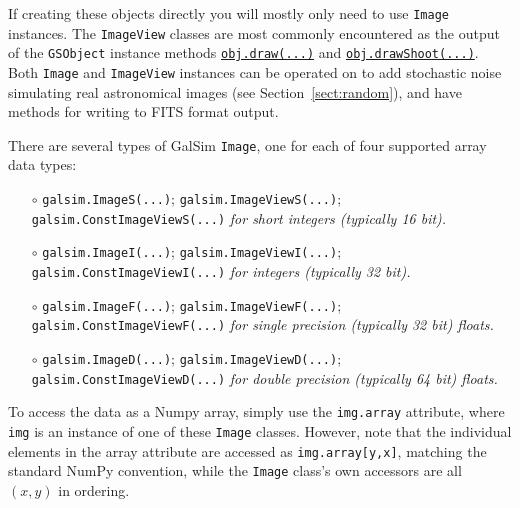 \documentclass[preprint,11pt]{aastex}
\begin{document}
If creating these objects directly you will mostly only need to use \texttt{Image} instances.  
The \texttt{ImageView} classes are most commonly encountered as the output
of the \texttt{GSObject} instance methods
\href{http://galsim-developers.github.com/GalSim/classgalsim_1_1base_1_1_g_s_object.html#ae0b346a8b438dedbc7f60a52220869d8}{\texttt{obj.draw(...)}}
and
\href{http://galsim-developers.github.com/GalSim/classgalsim_1_1base_1_1_g_s_object.html#a42ac334d2840ba3fa832988e998beca0}{\texttt{obj.drawShoot(...)}}. 
Both \texttt{Image} and \texttt{ImageView} instances can be
operated on to add stochastic noise 
simulating real astronomical images (see Section~\ref{sect:random}),
and have methods for writing to FITS format output. 

There are several types of GalSim \texttt{Image}, one for each of four
supported array data types:
\begin{itemize}

\item[$\circ$] \texttt{galsim.ImageS(...)}; \texttt{galsim.ImageViewS(...)};
  \texttt{galsim.ConstImageViewS(...)} \newline \emph{for short integers (typically 16 bit).}

\item[$\circ$] \texttt{galsim.ImageI(...)}; \texttt{galsim.ImageViewI(...)};
  \texttt{galsim.ConstImageViewI(...)} \newline \emph{for integers (typically 32 bit).}

\item[$\circ$] \texttt{galsim.ImageF(...)}; \texttt{galsim.ImageViewF(...)};
  \texttt{galsim.ConstImageViewF(...)} \newline \emph{for single precision (typically 32 bit)
  floats.}

\item[$\circ$] \texttt{galsim.ImageD(...)}; \texttt{galsim.ImageViewD(...)};
  \texttt{galsim.ConstImageViewD(...)} \newline \emph{for double precision (typically 64 bit)
  floats.}

\end{itemize}
To access the data as a Numpy array, simply use the \texttt{img.array}
attribute, where \texttt{img} is an instance of one of these
\texttt{Image} classes.  However, note that the individual elements in the array
attribute are accessed as \texttt{img.array[y,x]}, 
matching the standard NumPy convention, while the \texttt{Image}
class's own accessors are all $(x,y)$ in ordering.  
\end{document}

